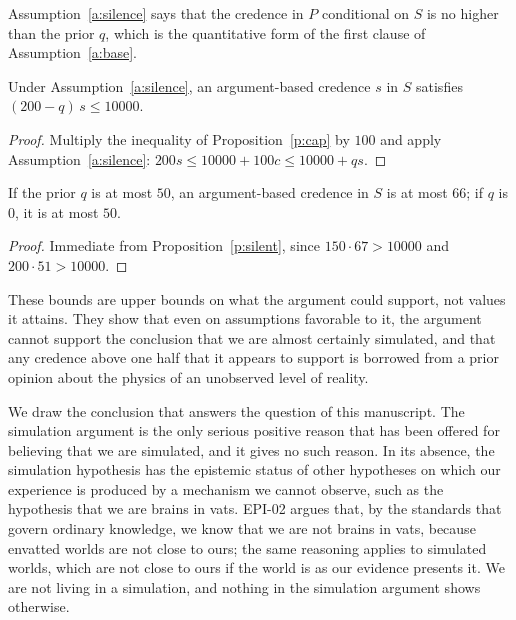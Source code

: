 \documentclass{situationist-preprint}
\begin{document}
Assumption~\ref{a:silence} says that the credence in $P$ conditional on $S$ is no higher than the prior $q$, which is the quantitative form of the first clause of Assumption~\ref{a:base}.

\begin{proposition}\label{p:silent}
Under Assumption~\ref{a:silence}, an argument-based credence $s$ in $S$ satisfies $(200 - q)\,s \le 10000$.
\end{proposition}

\begin{proof}
Multiply the inequality of Proposition~\ref{p:cap} by $100$ and apply Assumption~\ref{a:silence}: $200 s \le 10000 + 100 c \le 10000 + q s$.
\end{proof}

\begin{corollary}\label{c:values}
If the prior $q$ is at most $50$, an argument-based credence in $S$ is at most $66$; if $q$ is $0$, it is at most $50$.
\end{corollary}

\begin{proof}
Immediate from Proposition~\ref{p:silent}, since $150 \cdot 67 > 10000$ and $200 \cdot 51 > 10000$.
\end{proof}

These bounds are upper bounds on what the argument could support, not values it attains. They show that even on assumptions favorable to it, the argument cannot support the conclusion that we are almost certainly simulated, and that any credence above one half that it appears to support is borrowed from a prior opinion about the physics of an unobserved level of reality.

We draw the conclusion that answers the question of this manuscript. The simulation argument is the only serious positive reason that has been offered for believing that we are simulated, and it gives no such reason. In its absence, the simulation hypothesis has the epistemic status of other hypotheses on which our experience is produced by a mechanism we cannot observe, such as the hypothesis that we are brains in vats. EPI-02 argues that, by the standards that govern ordinary knowledge, we know that we are not brains in vats, because envatted worlds are not close to ours; the same reasoning applies to simulated worlds, which are not close to ours if the world is as our evidence presents it. We are not living in a simulation, and nothing in the simulation argument shows otherwise.
\end{document}
